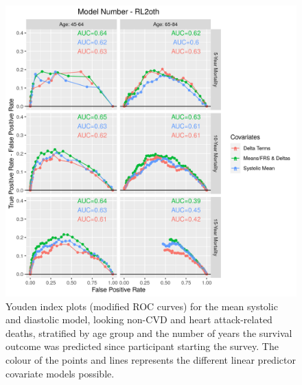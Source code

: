 \documentclass[
]{article}
\begin{document}
\begin{figure}
\centering
\includegraphics{./Rmarkdown_Plots/ROC_CAx-Covariates_EventType_RL2oth.png}
\caption{Youden index plots (modified ROC curves) for the mean systolic and diastolic model, looking non-CVD and heart attack-related deaths, stratified by age group and the number of years the survival outcome was predicted since participant starting the survey. The colour of the points and lines represents the different linear predictor covariate models possible.}\label{fig:ROC_RL2oth}
\end{figure}
\end{document}
